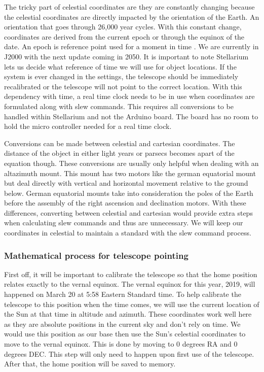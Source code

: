 \documentclass[12pt]{article}
\begin{document}
The tricky part of celestial coordinates are they are constantly changing because the celestial coordinates are directly impacted by the orientation of the Earth. An orientation that goes through 26,000 year cycles. With this constant change, coordinates are derived from the current epoch or through the equinox of the date. An epoch is reference point used for a moment in time \cite{epoch}. We are currently in J2000 with the next update coming in 2050. It is important to note Stellarium lets us decide what reference of time we will use for object locations. If the system is ever changed in the settings, the telescope should be immediately recalibrated or the telescope will not point to the correct location. With this dependency with time, a real time clock needs to be in use when coordinates are formulated along with slew commands. This requires all conversions to be handled within Stellarium and not the Arduino board. The board has no room to hold the micro controller needed for a real time clock.

Conversions can be made between celestial and cartesian coordinates. The distance of the object in either light years or parsecs becomes apart of the equation though. These conversions are usually only helpful when dealing with an altazimuth mount. This mount has two motors like the german equatorial mount but deal directly with vertical and horizontal movement relative to the ground below. German equatorial mounts take into consideration the poles of the Earth before the assembly of the right ascension and declination motors. With these differences, converting between celestial and cartesian would provide extra steps when calculating slew commands and thus are unnecessary. We will keep our coordinates in celestial to maintain a standard with the slew command process.

\subsubsection{Mathematical process for telescope pointing}

First off, it will be important to calibrate the telescope so that the home position relates exactly to the vernal equinox. The vernal equinox for this year, 2019, will happened on March 20 at 5:58 Eastern Standard time. To help calibrate the telescope to this position when the time comes, we will use the current location of the Sun at that time in altitude and azimuth. These coordinates work well here as they are absolute positions in the current sky and don’t rely on time. We would use this position as our base then use the Sun’s celestial coordinates to move to the vernal equinox. This is done by moving to 0 degrees RA and 0 degrees DEC. This step will only need to happen upon first use of the telescope. After that, the home position will be saved to memory.
\end{document}
